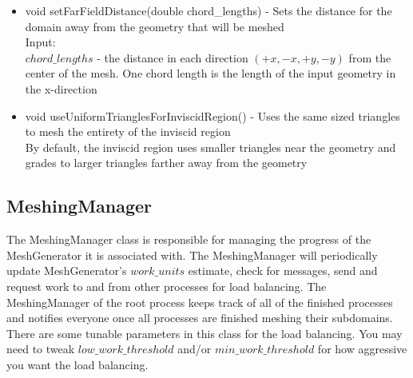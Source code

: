 \documentclass[manuscript, screen]{acmart}
\begin{document}
\begin{itemize}
\item void setFarFieldDistance(double chord\_lengths) - Sets the distance for the domain away from the geometry that will be meshed\\
Input:\\
$chord\_lengths$ - the distance in each direction $(+x, -x, +y, -y)$ from the center of the mesh. One chord length is the length of the input geometry in the x-direction

\item void useUniformTrianglesForInviscidRegion() - Uses the same sized triangles to mesh the entirety of the inviscid region\\
By default, the inviscid region uses smaller triangles near the geometry and grades to larger triangles farther away from the geometry


\end{itemize}

\subsection{MeshingManager}
The MeshingManager class is responsible for managing the progress of the MeshGenerator it is associated with. The MeshingManager will periodically update MeshGenerator's $work\_units$ estimate, check for messages, send and request work to and from other processes for load balancing. The MeshingManager of the root process keeps track of all of the finished processes and notifies everyone once all processes are finished meshing their subdomains. There are some tunable parameters in this class for the load balancing. You may need to tweak $low\_work\_threshold$ and/or $min\_work\_threshold$ for how aggressive you want the load balancing.
\end{document}
